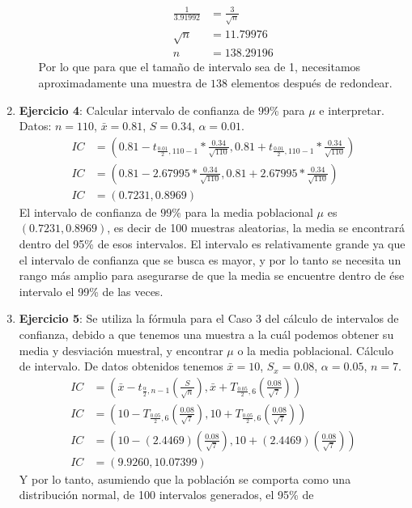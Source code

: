 \documentclass[12pt, letterpaper]{report}
\begin{document}
\begin{enumerate}
\begin{enumerate}
\begin{align*}
    \frac{1}{3.91992} &= \frac{3}{\sqrt{n}}\\
    \sqrt{n} &= 11.79976\\
    n &= 138.29196
\end{align*}
Por lo que para que el tamaño de intervalo sea de 1, necesitamos aproximadamente una muestra de $138$ elementos después de redondear. 
\end{enumerate}
\item \textbf{Ejercicio 4}: Calcular intervalo de confianza de $99$\% para $\mu$ e interpretar. \\ 
Datos: $n = 110$, $\bar{x} = 0.81$, $S = 0.34$, $\alpha = 0.01$. 
\begin{align*}
IC &= (0.81 - t_{\frac{0.01}{2}, 110 - 1} \ast \frac{0.34}{\sqrt{110}}, 0.81 + t_{\frac{0.01}{2}, 110 - 1} \ast \frac{0.34}{\sqrt{110}})\\
IC &= (0.81 - 2.67995 \ast \frac{0.34}{\sqrt{110}}, 0.81 +  2.67995 \ast \frac{0.34}{\sqrt{110}})\\ 
IC &= (0.7231, 0.8969)
\end{align*}
El intervalo de confianza de $99$\% para la media poblacional $\mu$ es $(0.7231, 0.8969)$, es decir de 100 
muestras aleatorias, la media se encontrará dentro del 95\% de esos intervalos. El intervalo es relativamente grande ya que 
el intervalo de confianza que se busca es mayor, y por lo tanto se necesita un rango más amplio para asegurarse de que la media 
se encuentre dentro de ése intervalo el 99\% de las veces. 
\item \textbf{Ejercicio 5}: Se utiliza la fórmula para el Caso 3 del cálculo de intervalos de confianza, debido a que 
tenemos una muestra a la cuál podemos obtener su media y desviación muestral, y encontrar $\mu$ o la media poblacional. Cálculo de 
intervalo. De datos obtenidos tenemos $\bar{x} = 10$, $S_x = 0.08$, $\alpha = 0.05$, $n = 7$. 
\begin{align*}
IC &= (\bar{x} - t_{\frac{\alpha}{2}, n-1}(\frac{S}{\sqrt{n}}), \bar{x} + T_{\frac{0.05}{2}, 6}(\frac{0.08}{\sqrt{7}}) )\\
IC &= (10- T_{\frac{0.05}{2}, 6}(\frac{0.08}{\sqrt{7}}), 10 +T_{\frac{0.05}{2}, 6}(\frac{0.08}{\sqrt{7}}))\\
IC &= (10-(2.4469)(\frac{0.08}{\sqrt{7}}), 10 + (2.4469)(\frac{0.08}{\sqrt{7}}))\\ 
IC &= (9.9260, 10.07399)
\end{align*}
Y por lo tanto, asumiendo que la población se comporta como una distribución normal, de 100 intervalos generados, el 95\% de 

\end{enumerate}
\end{document}
